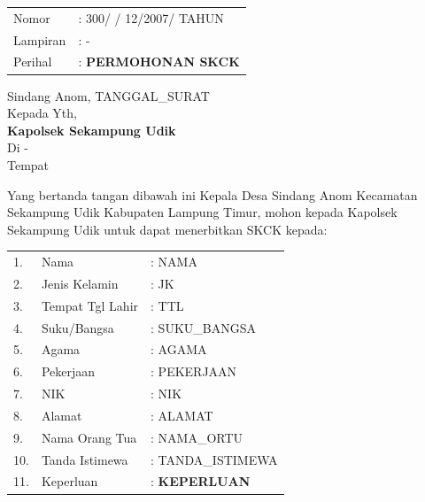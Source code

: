 \documentclass[a4paper, 12pt]{article}
\begin{document}
\vspace{0.5cm}
\rmfamily

\noindent
\begin{minipage}[t]{0.55\textwidth}
    \begin{tabular}{@{}ll}
        Nomor & : 300/ \hspace{0.5cm} / 12/2007/ {{TAHUN}} \\
        Lampiran & : - \\
        Perihal & : \textbf{PERMOHONAN SKCK} \\
    \end{tabular}
\end{minipage}%
\begin{minipage}[t]{0.45\textwidth}
    Sindang Anom, {{TANGGAL_SURAT}} \\ %
    Kepada Yth,\\
    \textbf{Kapolsek Sekampung Udik}\\
    Di - \\
    \hspace{0.5cm} Tempat
\end{minipage}

\vspace{0.8cm}
Yang bertanda tangan dibawah ini Kepala Desa Sindang Anom Kecamatan Sekampung Udik Kabupaten Lampung Timur, mohon kepada Kapolsek Sekampung Udik untuk dapat menerbitkan SKCK kepada: 

\vspace{0.3cm}
\begin{tabularx}{\textwidth}{l l X}
    1. & Nama & : {{NAMA}} \\
    2. & Jenis Kelamin & : {{JK}} \\
    3. & Tempat Tgl Lahir & : {{TTL}} \\
    4. & Suku/Bangsa & : {{SUKU_BANGSA}} \\ %
    5. & Agama & : {{AGAMA}} \\
    6. & Pekerjaan & : {{PEKERJAAN}} \\
    7. & NIK & : {{NIK}} \\
    8. & Alamat & : {{ALAMAT}} \\
    9. & Nama Orang Tua & : {{NAMA_ORTU}} \\
    10. & Tanda Istimewa & : {{TANDA_ISTIMEWA}} \\
    11. & Keperluan & : \textbf{{{KEPERLUAN}}} \\
\end{tabularx}
\vspace{0.3cm}
\end{document}
